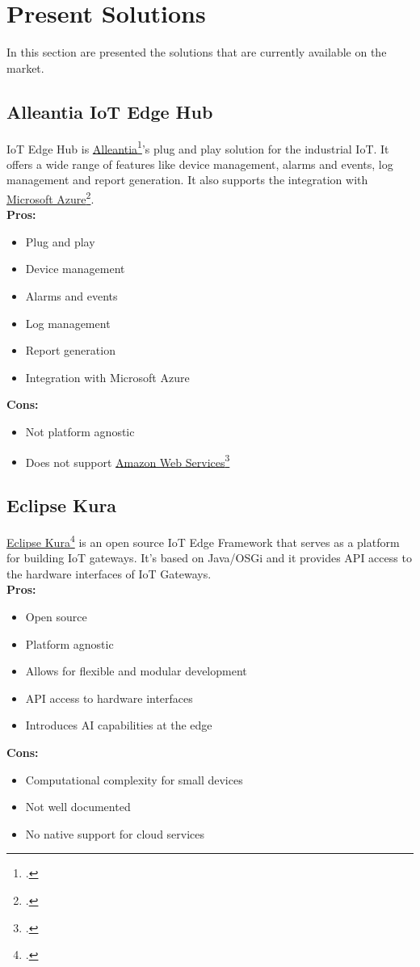 \section{Present Solutions}
In this section are presented the solutions that are currently available on the market.

\subsection{Alleantia IoT Edge Hub}
\label{alleantia}
IoT Edge Hub is \href{www.alleantia.com}{Alleantia}\footcite{site:alleantia}'s plug and play solution for the industrial IoT.
It offers a wide range of features like device management, alarms and events, log management and report generation.
It also supports the integration with \href{https://www.microsoft.com/it-it/azure}{Microsoft Azure}\footcite{site:azure}.\\
\textbf{Pros:}
\begin{itemize}
    \item Plug and play
    \item Device management
    \item Alarms and events
    \item Log management
    \item Report generation
    \item Integration with Microsoft Azure
\end{itemize}
\textbf{Cons:}
\begin{itemize}
    \item Not platform agnostic
    \item Does not support \href{https://aws.amazon.com/it/}{Amazon Web Services}\footcite{site:aws}
\end{itemize}

\subsection{Eclipse Kura}
\label{kura}
\href{https://eclipse.dev/kura/}{Eclipse Kura}\footcite{site:kura} is an open source IoT Edge Framework that serves as a platform for building IoT gateways.
It's based on Java/OSGi and it provides API access to the hardware interfaces of IoT Gateways.\\
\textbf{Pros:}
\begin{itemize}
    \item Open source
    \item Platform agnostic
    \item Allows for flexible and modular development
    \item API access to hardware interfaces
    \item Introduces AI capabilities at the edge
\end{itemize}
\textbf{Cons:}  
\begin{itemize}
    \item Computational complexity for small devices
    \item Not well documented
    \item No native support for cloud services
\end{itemize}


